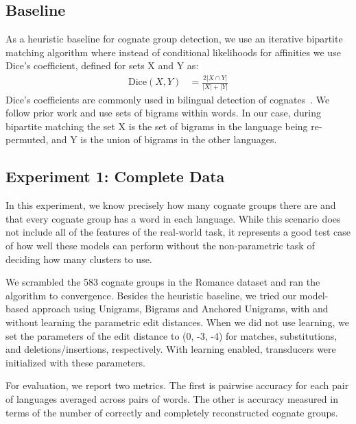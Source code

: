 \documentclass[11pt,a4paper]{article}
\begin{document}
\subsection{Baseline}
\label{sec:baseline}

As a heuristic baseline for cognate group detection, we use an iterative
bipartite matching algorithm where instead of conditional likelihoods
for affinities we use Dice's coefficient, defined for sets X and
Y as:
\begin{equation}
  \begin{split}
    \mathrm{Dice}(X,Y) &= \frac{2 |X\cap Y|}{|X| + |Y|}
   \end{split}
 \end{equation}
Dice's coefficients are commonly used in bilingual detection of
cognates~\cite{Kondrak01identifyingcognates,Kondrak03cognatescan}. We
follow prior work and use sets of bigrams within words. In our case,
during bipartite matching the set X is the set of bigrams in the
language being re-permuted, and Y is the union of bigrams in the other languages.

\subsection{Experiment 1: Complete Data}

In this experiment, we know precisely how many cognate groups there
are and that every cognate group has a word in each language. While
this scenario does not include all of the features of the real-world
task, it represents a good test case of how well these models can
perform without the non-parametric task of deciding how many clusters
to use.

We scrambled the 583 cognate groups in the Romance dataset and ran
the algorithm to convergence. Besides the heuristic baseline, we
tried our model-based approach using Unigrams, Bigrams and Anchored
Unigrams, with and without learning the parametric edit distances.
When we did not use learning, we set the parameters of the edit
distance to (0, -3, -4) for matches, substitutions, and
deletions/insertions, respectively. With learning enabled, transducers
were initialized with these parameters.

For evaluation, we report two metrics. The first is pairwise accuracy
for each pair of languages averaged across pairs of words.
The other is accuracy measured in terms of the number of correctly
and completely reconstructed cognate groups.
\end{document}
